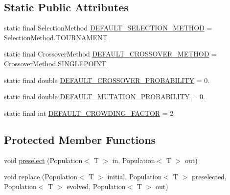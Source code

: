 \subsection*{Static Public Attributes}
\begin{DoxyCompactItemize}
\item 
static final Selection\-Method \hyperlink{classjenes_1_1stage_1_1operator_1_1common_1_1_de_jong_crowder_3_01_t_01extends_01_chromosome_01_4_a21277e6e0728d4e83cc353337bc5f66d}{D\-E\-F\-A\-U\-L\-T\-\_\-\-S\-E\-L\-E\-C\-T\-I\-O\-N\-\_\-\-M\-E\-T\-H\-O\-D} = \hyperlink{enumjenes_1_1stage_1_1operator_1_1common_1_1_de_jong_crowder_3_01_t_01extends_01_chromosome_01_4_1_1_selection_method_a46ad310865d9047eec57ee2efc92edf2}{Selection\-Method.\-T\-O\-U\-R\-N\-A\-M\-E\-N\-T}
\item 
static final Crossover\-Method \hyperlink{classjenes_1_1stage_1_1operator_1_1common_1_1_de_jong_crowder_3_01_t_01extends_01_chromosome_01_4_a2798047916292a1449952a7274f9f26d}{D\-E\-F\-A\-U\-L\-T\-\_\-\-C\-R\-O\-S\-S\-O\-V\-E\-R\-\_\-\-M\-E\-T\-H\-O\-D} = \hyperlink{enumjenes_1_1stage_1_1operator_1_1common_1_1_de_jong_crowder_3_01_t_01extends_01_chromosome_01_4_1_1_crossover_method_ad183df18f5f62b93addbb68e53ed52d1}{Crossover\-Method.\-S\-I\-N\-G\-L\-E\-P\-O\-I\-N\-T}
\item 
static final double \hyperlink{classjenes_1_1stage_1_1operator_1_1common_1_1_de_jong_crowder_3_01_t_01extends_01_chromosome_01_4_a522c94dff2a39743f6dfddec03a2ce47}{D\-E\-F\-A\-U\-L\-T\-\_\-\-C\-R\-O\-S\-S\-O\-V\-E\-R\-\_\-\-P\-R\-O\-B\-A\-B\-I\-L\-I\-T\-Y} = 0.
\item 
static final double \hyperlink{classjenes_1_1stage_1_1operator_1_1common_1_1_de_jong_crowder_3_01_t_01extends_01_chromosome_01_4_a19680564524e8d194044526740001c84}{D\-E\-F\-A\-U\-L\-T\-\_\-\-M\-U\-T\-A\-T\-I\-O\-N\-\_\-\-P\-R\-O\-B\-A\-B\-I\-L\-I\-T\-Y} = 0.
\item 
static final int \hyperlink{classjenes_1_1stage_1_1operator_1_1common_1_1_de_jong_crowder_3_01_t_01extends_01_chromosome_01_4_a7e7afe01b26af0cdd28d392ab7866576}{D\-E\-F\-A\-U\-L\-T\-\_\-\-C\-R\-O\-W\-D\-I\-N\-G\-\_\-\-F\-A\-C\-T\-O\-R} = 2
\end{DoxyCompactItemize}
\subsection*{Protected Member Functions}
\begin{DoxyCompactItemize}
\item 
void \hyperlink{classjenes_1_1stage_1_1operator_1_1common_1_1_de_jong_crowder_3_01_t_01extends_01_chromosome_01_4_a98f463e26bf3fd0fd703320007302594}{preselect} (Population$<$ T $>$ in, Population$<$ T $>$ out)
\item 
void \hyperlink{classjenes_1_1stage_1_1operator_1_1common_1_1_de_jong_crowder_3_01_t_01extends_01_chromosome_01_4_a7d659276ad2103199080458c85acf59e}{replace} (Population$<$ T $>$ initial, Population$<$ T $>$ preselected, Population$<$ T $>$ evolved, Population$<$ T $>$ out)
\end{DoxyCompactItemize}
